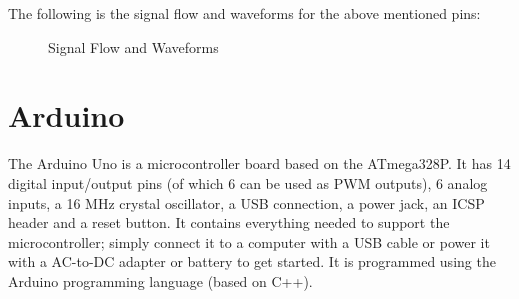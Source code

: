 \documentclass[12pt, a4paper, oneside]{report}
\begin{document}
The following is the signal flow and waveforms for the above mentioned pins:
\begin{figure}[h]
    \centering
    \hfill
    \par
    \caption{Signal Flow and Waveforms}
\end{figure}

\section{Arduino}

The Arduino Uno is a microcontroller board based on the ATmega328P. It has 14 digital input/output pins (of which 6 can be used as PWM outputs), 6 analog inputs, a 16 MHz crystal oscillator, a USB connection, a power jack, an ICSP header and a reset button. It contains everything needed to support the microcontroller; simply connect it to a computer with a USB cable or power it with a AC-to-DC adapter or battery to get started. It is programmed using the Arduino programming language (based on C++).
\end{document}
